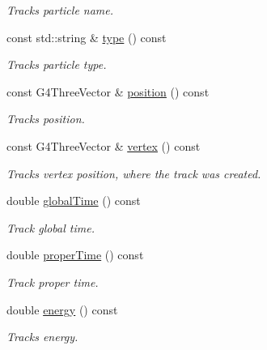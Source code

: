 \begin{DoxyCompactItemize}
\begin{DoxyCompactList}\small\item\em Track\textquotesingle{}s particle name. \end{DoxyCompactList}\item 
const std\+::string \& \hyperlink{class_d_d4hep_1_1_simulation_1_1_geant4_track_handler_a619850c062c24f0c3dc6138aae3ffbcb}{type} () const
\begin{DoxyCompactList}\small\item\em Track\textquotesingle{}s particle type. \end{DoxyCompactList}\item 
const G4\+Three\+Vector \& \hyperlink{class_d_d4hep_1_1_simulation_1_1_geant4_track_handler_a03fa77009e7a4af92b45457be799baa5}{position} () const
\begin{DoxyCompactList}\small\item\em Track\textquotesingle{}s position. \end{DoxyCompactList}\item 
const G4\+Three\+Vector \& \hyperlink{class_d_d4hep_1_1_simulation_1_1_geant4_track_handler_a170e1d49e624b26b540485e0aa3f5549}{vertex} () const
\begin{DoxyCompactList}\small\item\em Track\textquotesingle{}s vertex position, where the track was created. \end{DoxyCompactList}\item 
double \hyperlink{class_d_d4hep_1_1_simulation_1_1_geant4_track_handler_a6baa2a4bff1728d1de2d83da6e06cbdd}{global\+Time} () const
\begin{DoxyCompactList}\small\item\em Track global time. \end{DoxyCompactList}\item 
double \hyperlink{class_d_d4hep_1_1_simulation_1_1_geant4_track_handler_a48e9356a58f172abf33d1410d3aa61c2}{proper\+Time} () const
\begin{DoxyCompactList}\small\item\em Track proper time. \end{DoxyCompactList}\item 
double \hyperlink{class_d_d4hep_1_1_simulation_1_1_geant4_track_handler_a9f570cb8f5bda9880c39a08c970d68fe}{energy} () const
\begin{DoxyCompactList}\small\item\em Track\textquotesingle{}s energy. \end{DoxyCompactList}\item 

\end{DoxyCompactItemize}
